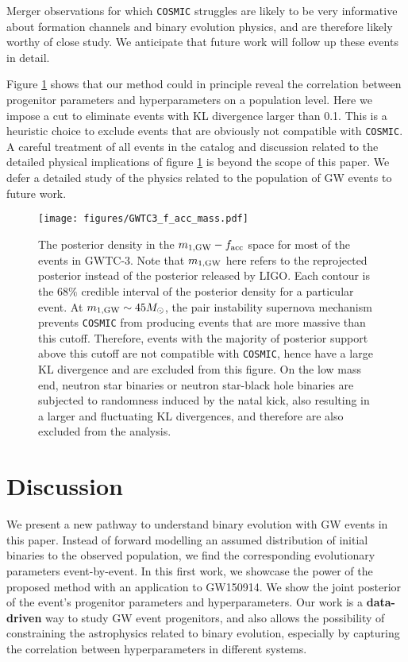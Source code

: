 \documentclass[linenumbers,twocolumn]{aastex631}
\begin{document}
Merger observations for which \texttt{COSMIC} struggles are likely to be very
informative about formation channels and binary evolution physics, and are
therefore likely worthy of close study.  We anticipate that future work will
follow up these events in detail.

Figure \ref{fig:GWTC-3_f_acc_mass} shows that our method could in principle
reveal the correlation between progenitor parameters and hyperparameters on a
population level. Here we impose a cut to eliminate events with KL divergence
larger than 0.1. This is a heuristic choice to exclude events that are obviously
not compatible with \texttt{COSMIC}. A careful treatment of all events in the
catalog and discussion related to the detailed physical implications of figure
\ref{fig:GWTC-3_f_acc_mass} is beyond the scope of this paper.  We defer a
detailed study of the physics related to the population of GW events to future
work.


\begin{figure}
\texttt{[image: figures/GWTC3\_f\_acc\_mass.pdf]}
\caption{ The posterior density in the $m_{1,{\rm GW}}-f_{\rm acc}$ space for
    most of the events in GWTC-3. Note that $m_{1,{\rm GW}}$ here refers to the
    reprojected posterior instead of the posterior released by LIGO. Each
    contour is the $68\%$ credible interval of the posterior density for a
    particular event. At $m_{1,{\rm GW}} \sim 45 M_{\odot}$, the pair
    instability supernova mechanism prevents \texttt{COSMIC} from producing
    events that are more massive than this cutoff. Therefore, events with the
    majority of posterior support above this cutoff are not compatible with
    \texttt{COSMIC}, hence have a large KL divergence and are excluded from this
    figure. On the low mass end, neutron star binaries or neutron star-black
    hole binaries are subjected to randomness induced by the natal kick, also
    resulting in a larger and fluctuating KL divergences, and therefore are also
    excluded from the analysis. }
\label{fig:GWTC-3_f_acc_mass}
\end{figure}

\section{Discussion}
\label{sec:discussion}


We present a new pathway to understand binary evolution with GW events in this
paper. Instead of forward modelling an assumed distribution of initial binaries
to the observed population, we find the corresponding evolutionary parameters
event-by-event. In this first work, we showcase the power of the proposed method
with an application to GW150914. We show the joint posterior of the event's
progenitor parameters and hyperparameters.  Our work is a \textbf{data-driven}
way to study GW event progenitors, and also allows the possibility of
constraining the astrophysics related to binary evolution, especially by
capturing the correlation between hyperparameters in different systems.
\end{document}
